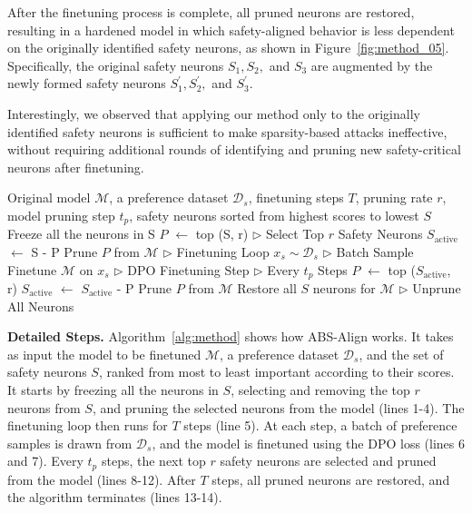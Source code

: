 After the finetuning process is complete, all pruned neurons are restored, resulting in a hardened model in which safety-aligned behavior is less dependent on the originally identified safety neurons, as shown in Figure~\ref{fig:method_05}. Specifically, the original safety neurons $S_1, S_2,$ and $S_3$ are augmented by the newly formed safety neurons $S_1^\prime, S_2^\prime,$ and $S_3^\prime$.

Interestingly, we observed that applying our method only to the originally identified safety neurons is sufficient to make sparsity-based attacks ineffective, without requiring additional rounds of identifying and pruning new safety-critical neurons after finetuning.


\begin{algorithm}[t]
  \centering
    \caption{\method}
    \label{alg:method}
    \begin{algorithmic}[1]
        \Require Original model $\mathcal{M}$, a preference
        dataset $\mathcal{D}_s$, finetuning steps $T$, pruning rate $r$, model pruning step $t_p$, safety neurons sorted from highest scores to lowest $S$
        \Statex \vspace{-0.5em}
        \State Freeze all the neurons in S
        \State $P$ $\leftarrow$ top (S, r)  \hfill $\triangleright$ Select Top $r$ Safety Neurons
        \State $S_{\text{active}}$ $\leftarrow$ S - P
        \State Prune $P$ from $\mathcal{M}$ 
         \hfill $\triangleright$ Finetuning Loop
            \State $x_s \sim \mathcal{D}_s$ \hfill $\triangleright$ Batch Sample
            \State Finetune $\mathcal{M}$ on $x_s$ \hfill $\triangleright$ DPO Finetuning Step
                 \hfill $\triangleright$ Every $t_p$ Steps
                    \State $P$ $\leftarrow$ top ($S_{\text{active}}$, r)
                    \State $S_{\text{active}}$ $\leftarrow$ $S_{\text{active}}$ - P
                    \State Prune $P$ from $\mathcal{M}$                    
                \EndIf
        \EndFor
        \State Restore all $S$ neurons for $\mathcal{M}$ \hfill $\triangleright$ Unprune All Neurons
    \end{algorithmic}
\end{algorithm}


\textbf{Detailed Steps.} Algorithm~\ref{alg:method} shows how ABS-Align works. It takes as input the model to be finetuned $\mathcal{M}$, a preference dataset $\mathcal{D}_s$, and the set of safety neurons $S$, ranked from most to least important according to their scores. It starts by freezing all the neurons in $S$, selecting and removing the top $r$ neurons from $S$, and pruning the selected neurons from the model (lines 1-4). The finetuning loop then runs for $T$ steps (line 5). At each step, a batch of preference samples is drawn from $\mathcal{D}_s$, and the model is finetuned using the DPO loss (lines 6 and 7). Every $t_p$ steps, the next top $r$ safety neurons are selected and pruned from the model (lines 8-12). After $T$ steps, all pruned neurons are restored, and the algorithm terminates (lines 13-14).

